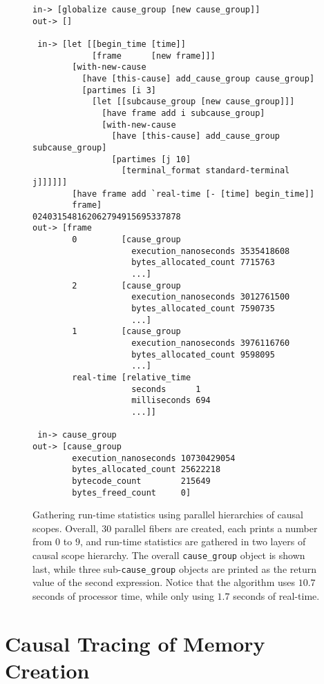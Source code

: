 \begin{figure}[h]
\centering
{\small
\begin{Verbatim}[frame=single]
 in-> [globalize cause_group [new cause_group]]
out-> []

 in-> [let [[begin_time [time]]
            [frame      [new frame]]]
        [with-new-cause
          [have [this-cause] add_cause_group cause_group]
          [partimes [i 3]
            [let [[subcause_group [new cause_group]]]
              [have frame add i subcause_group]
              [with-new-cause
                [have [this-cause] add_cause_group subcause_group]
                [partimes [j 10]
                  [terminal_format standard-terminal j]]]]]]
        [have frame add `real-time [- [time] begin_time]]
        frame]
024031548162062794915695337878                      
out-> [frame
        0         [cause_group
                    execution_nanoseconds 3535418608
                    bytes_allocated_count 7715763
                    ...]
        2         [cause_group
                    execution_nanoseconds 3012761500
                    bytes_allocated_count 7590735
                    ...]
        1         [cause_group
                    execution_nanoseconds 3976116760
                    bytes_allocated_count 9598095
                    ...]
        real-time [relative_time
                    seconds      1
                    milliseconds 694
                    ...]]

 in-> cause_group
out-> [cause_group
        execution_nanoseconds 10730429054
        bytes_allocated_count 25622218
        bytecode_count        215649
        bytes_freed_count     0]
\end{Verbatim}
}
\caption[Gathering run-time statistics using parallel hierarchies of
  causal scopes.]{Gathering run-time statistics using parallel
  hierarchies of causal scopes.  Overall, $30$ parallel fibers are
  created, each prints a number from $0$ to $9$, and run-time
  statistics are gathered in two layers of causal scope hierarchy.
  The overall {\tt{cause\_group}} object is shown last, while three
  sub-{\tt{cause\_group}} objects are printed as the return value of
  the second expression.  Notice that the algorithm uses $10.7$
  seconds of processor time, while only using $1.7$ seconds of
  real-time.}
\label{figure:hierarchical_cause_group_statistics}
\end{figure}

\section{Causal Tracing of Memory Creation}

